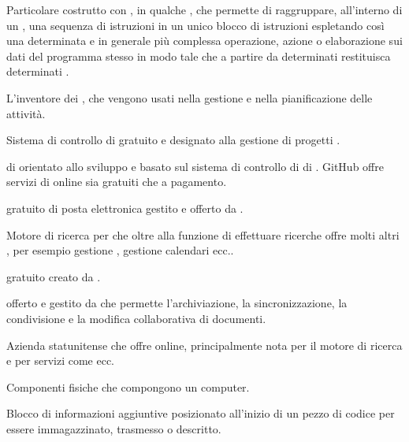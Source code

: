 {Particolare costrutto con , in qualche , che permette di raggruppare, all'interno di un , una sequenza di istruzioni in un unico blocco di istruzioni espletando così una determinata e in generale più complessa operazione, azione o elaborazione sui dati del programma stesso in modo tale che a partire da determinati  restituisca determinati .}




{L'inventore dei , che vengono usati nella gestione e nella pianificazione delle attività.}

{Sistema di controllo di   gratuito e  designato alla gestione di progetti .}

{ di   orientato allo sviluppo  e basato sul sistema di controllo di  di . GitHub offre servizi di  online sia gratuiti che a pagamento.}

{ gratuito di posta elettronica gestito e offerto da .}

{Motore di ricerca per  che oltre alla funzione di effettuare ricerche offre molti altri , per esempio gestione , gestione calendari ecc..} 

{ gratuito creato da .}

{ offerto e gestito da  che permette l'archiviazione, la sincronizzazione, la condivisione e la modifica collaborativa di documenti.}

{Azienda statunitense che offre  online, principalmente nota per il motore di ricerca  e per servizi come  ecc.}




{Componenti fisiche che compongono un computer.}

{Blocco di informazioni aggiuntive posizionato all'inizio di un pezzo di codice per essere immagazzinato, trasmesso o descritto.}

